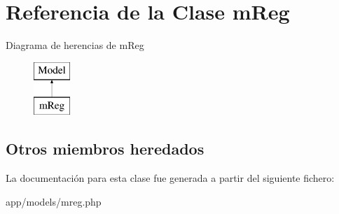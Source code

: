 \hypertarget{classm_reg}{}\section{Referencia de la Clase m\+Reg}
\label{classm_reg}
Diagrama de herencias de m\+Reg\begin{figure}[H]
\begin{center}
\leavevmode
\includegraphics[height=2.000000cm]{classm_reg}
\end{center}
\end{figure}
\subsection*{Otros miembros heredados}


La documentación para esta clase fue generada a partir del siguiente fichero\+:\begin{DoxyCompactItemize}
\item 
app/models/mreg.\+php\end{DoxyCompactItemize}
